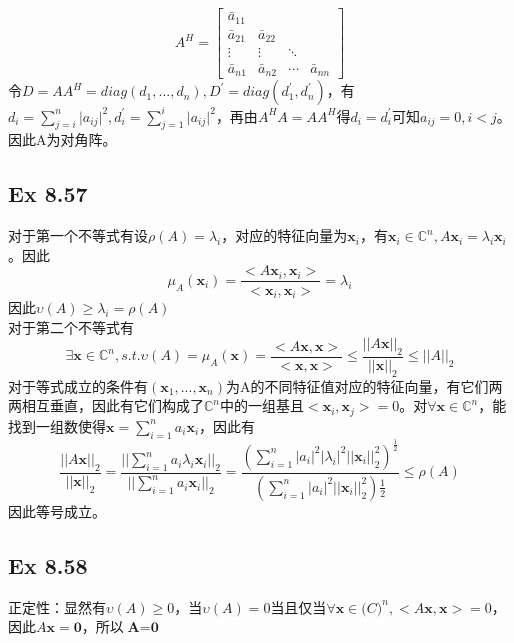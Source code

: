 \documentclass{article}
\begin{document}
\begin{equation*}
	A^{H}=\left[
	\begin{array}{cccc}	
	\bar{a}_{11} & & & \\	
	\bar{a}_{21}&\bar{a}_{22} & & \\	
	\vdots& \vdots & \ddots & \\	
	\bar{a}_{n1}& \bar{a}_{n2} & \cdots &\bar{a}_{nn}	
	\end{array}\right]
\end{equation*}
令$D=AA^{H}=diag(d_{1},...,d_{n}),D^{'}=diag(d^{'}_{1},d^{'}_{n})$，有$d_{i}=\sum_{j=i}^{n}\vert a_{ij}\vert^{2},d^{'}_{i}=\sum_{j=1}^{i}\vert a_{ij}\vert^{2}$，再由$A^{H}A=AA^{H}$得$d_{i}=d^{'}_{i}$可知$a_{ij}=0,i<j$。因此A为对角阵。

\subsection*{Ex 8.57}
\indent 对于第一个不等式有设$\rho(A)=\lambda_{i}$，对应的特征向量为$\textbf{x}_{i}$，有$\textbf{x}_{i}\in\mathbb{C}^{n},A\textbf{x}_{i}=\lambda_{i}\textbf{x}_{i}$。因此
$$
\mu_{A}(\textbf{x}_{i})=\frac{<A\textbf{x}_{i},\textbf{x}_{i}>}{<\textbf{x}_{i},\textbf{x}_{i}>}=\lambda_{i}
$$
因此$\upsilon(A)\ge\lambda_{i}=\rho(A)$\\
\indent 对于第二个不等式有
$$\exists \textbf{x} \in \mathbb{C}^{n},s.t.\upsilon(A)=\mu_{A}(\textbf{x})=\frac{<A\textbf{x},\textbf{x}>}{<\textbf{x},\textbf{x}>}\le \frac{\vert\vert A\textbf{x}\vert\vert_{2}}{\vert\vert\textbf{x}\vert\vert_{2}}\le \vert\vert A\vert\vert_{2}
$$
\indent 对于等式成立的条件有$(\textbf{x}_{1},...,\textbf{x}_{n})$为A的不同特征值对应的特征向量，有它们两两相互垂直，因此有它们构成了$\mathbb{C}^{n}$中的一组基且$<\textbf{x}_{i},\textbf{x}_{j}>=0$。对$\forall \textbf{x}\in \mathbb{C}^{n}$，能找到一组数使得$\textbf{x}=\sum_{i=1}^{n}a_{i}\textbf{x}_{i}$，因此有
$$
\frac{\vert\vert A\textbf{x}\vert\vert_{2}}{\vert\vert\textbf{x}\vert\vert_{2}}=\frac{\vert\vert\sum_{i=1}^{n}a_{i}\lambda_{i}\textbf{x}_{i}\vert\vert_{2}}{\vert\vert\sum_{i=1}^{n}a_{i}\textbf{x}_{i}\vert\vert_{2}}=\frac{(\sum_{i=1}^{n}\vert a_{i}\vert^{2}\vert\lambda_{i}\vert^{2}\vert\vert\textbf{x}_{i}\vert\vert_{2}^{2})^{\frac{1}{2}}}{(\sum_{i=1}^{n}\vert a_{i}\vert^{2}\vert\vert\textbf{x}_{i}\vert\vert_{2}^{2})\frac{1}{2}}\le\rho(A)
$$
因此等号成立。

\subsection*{Ex 8.58}
\indent 正定性：显然有$\upsilon(A)\ge0$，当$\upsilon(A)=0$当且仅当$\forall \textbf{x}\in\mathbb(C)^{n},<A\textbf{x},\textbf{x}>=0$，因此$A\textbf{x}=\textbf{0}$，所以$\textbf{A}=\textbf{0}$
\end{document}
